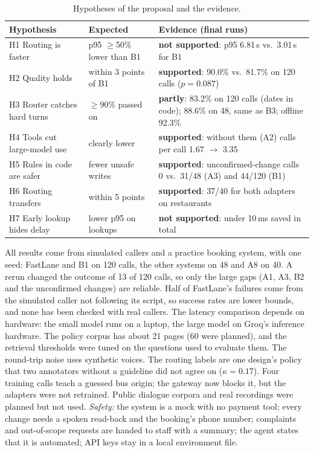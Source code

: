 \documentclass[11pt,a4paper]{article}
\makeatletter
\renewcommand\section{\@startsection{section}{1}{\z@}{-2.0ex plus -0.5ex minus -0.2ex}{1.0ex plus 0.2ex}{\large\bfseries\raggedright}}
\makeatother
\begin{document}
\begin{table}[tbp]
\centering\small
\begin{tabularx}{\linewidth}{@{}>{\raggedright\arraybackslash}p{3.6cm}>{\raggedright\arraybackslash}p{3.0cm}L@{}}
\toprule
Hypothesis & Expected & Evidence (final runs) \\
\midrule
H1 Routing is faster & p95 $\geq$50\% lower than B1 & \textbf{not supported}: p95 6.81\,s vs.\ 3.01\,s for B1 \\
H2 Quality holds & within 3 points of B1 & \textbf{supported}: 90.0\% vs.\ 81.7\% on 120 calls ($p=0.087$) \\
H3 Router catches hard turns & $\geq$90\% passed on & \textbf{partly}: 83.2\% on 120 calls (dates in code); 88.6\% on 48, same as B3; offline 92.3\% \\
H4 Tools cut large-model use & clearly lower & \textbf{supported}: without them (A2) calls per call 1.67 $\rightarrow$ 3.35 \\
H5 Rules in code are safer & fewer unsafe writes & \textbf{supported}: unconfirmed-change calls 0 vs.\ 31/48 (A3) and 44/120 (B1) \\
H6 Routing transfers & within 5 points & \textbf{supported}: 37/40 for both adapters on restaurants \\
H7 Early lookup hides delay & lower p95 on lookups & \textbf{not supported}: under 10\,ms saved in total \\
\bottomrule
\end{tabularx}
\caption{Hypotheses of the proposal and the evidence.}
\label{tab:hyp}
\end{table}

\section{Limitations}
All results come from simulated callers and a practice booking system, with one seed: FastLane and B1 on 120 calls,
the other systems on 48 and A8 on 40. A rerun changed the outcome of 13 of 120 calls, so only the large gaps (A1, A3,
B2 and the unconfirmed changes) are reliable. Half of FastLane's failures come from the simulated caller not
following its script, so success rates are lower bounds, and none has been checked with real callers. The latency
comparison depends on hardware: the small model runs on a laptop, the large model on Groq's inference hardware. The
policy corpus has about 21 pages (60 were planned), and the retrieval thresholds were tuned on the questions used to
evaluate them. The round-trip noise uses synthetic voices. The routing labels are one design's policy that two
annotators without a guideline did not agree on ($\kappa=0.17$). Four training calls teach a guessed bus origin; the
gateway now blocks it, but the adapters were not retrained. Public dialogue corpora and real recordings were planned
but not used. \emph{Safety:} the system is a mock with no payment tool; every change needs a spoken read-back and the
booking's phone number; complaints and out-of-scope requests are handed to staff with a summary; the agent states that
it is automated; API keys stay in a local environment file.
\end{document}
